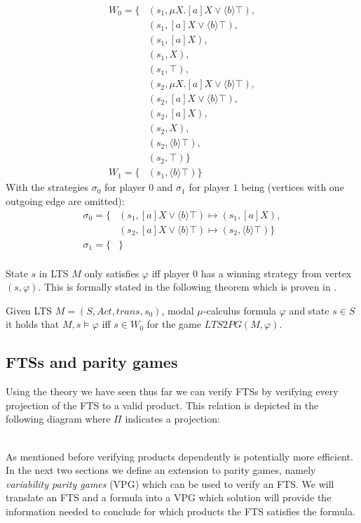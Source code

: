 \begin{align*}
W_0 = \{& (s_1, \mu X.[a]X \vee \langle b \rangle \top),\\
& (s_1, [a]X \vee \langle b \rangle \top),\\
& (s_1, [a]X),\\
& (s_1, X),\\
& (s_1, \top),\\
& (s_2, \mu X.[a]X \vee \langle b \rangle \top),\\
& (s_2, [a]X \vee \langle b \rangle \top),\\
& (s_2, [a]X),\\
& (s_2, X),\\
& (s_2, \langle b \rangle \top),\\
& (s_2, \top)
 \}\\
W_1 = \{& (s_1, \langle b \rangle \top )\}
\end{align*}
With the strategies $\sigma_0$ for player $0$ and $\sigma_1$ for player $1$ being (vertices with one outgoing edge are omitted):
\begin{align*}
\sigma_0 = \{
&(s_1, [a]X \vee \langle b \rangle \top) \mapsto (s_1, [a] X), \\
&(s_2, [a]X \vee \langle b \rangle \top) \mapsto (s_2, \langle b \rangle \top) \} \\
\sigma_1 = \{&\} \\
\end{align*}

State $s$ in LTS $M$ only satisfies $\varphi$ iff player $0$ has a winning strategy from vertex $(s, \varphi)$. This is formally stated in the following theorem which is proven in \cite{Bradfield2018}.
\begin{theorem}
	\label{the_LTS_PG_REL}Given LTS $M = (S, Act, trans, s_0)$, modal $\mu$-calculus formula $\varphi$ and state $s \in S$ it holds that $M, s \models \varphi$ iff $s \in W_0$ for the game $LTS2PG(M, \varphi)$.
\end{theorem}

\subsection{FTSs and parity games}
Using the theory we have seen thus far we can verify FTSs by verifying every projection of the FTS to a valid product. This relation is depicted in the following diagram where $\Pi$ indicates a projection:
\\\\
As mentioned before verifying products dependently is potentially more efficient. In the next two sections we define an extension to parity games, namely \textit{variability parity games} (VPG) which can be used to verify an FTS. We will translate an FTS and a formula into a VPG which solution will provide the information needed to conclude for which products the FTS satisfies the formula.
